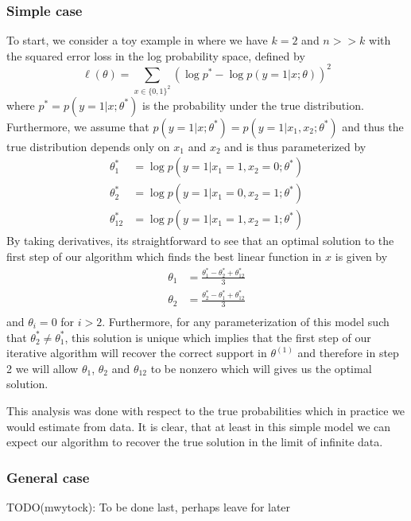 \documentclass[12pt]{article}
\begin{document}
\subsubsection{Simple case}

To start, we consider a toy example in where we have $k = 2$ and $n >> k$ with the squared error loss in the log probability space, defined by
\begin{equation}
\ell(\theta) = \sum_{x \in \{0,1\}^2} (\log p^* - \log p(y=1|x;\theta))^2
\end{equation}
where $p^* = p(y=1|x;\theta^*)$ is the probability under the true distribution. Furthermore, we assume that $p(y=1|x;\theta^*) = p(y=1|x_1,x_2;\theta^*)$ and thus the true distribution depends only on $x_1$ and $x_2$ and is thus parameterized by
\begin{equation}
\begin{split}
\theta_1^* &= \log p(y=1 |x_1 = 1,x_2=0;\theta^*) \\
\theta_2^* &= \log p(y=1 |x_1 = 0,x_2=1;\theta^*) \\
\theta_{12}^* &= \log p(y=1 |x_1 = 1,x_2=1;\theta^*)
\end{split}
\end{equation}
By taking derivatives, its straightforward to see that an optimal solution to the first step of our algorithm which finds the best linear function in $x$ is given by
\begin{equation}
\begin{split}
\theta_1 &= \frac{\theta_1^* - \theta_2^* + \theta_{12}^*}{3} \\
\theta_2 &= \frac{\theta_2^* - \theta_1^* + \theta_{12}^*}{3} \\
\end{split}
\end{equation}
and $\theta_i = 0$ for $i > 2$. Furthermore, for any parameterization of this model such that $\theta_2^* \ne \theta_1^*$, this solution is unique which implies that the first step of our iterative algorithm will recover the correct support in $\theta^{(1)}$ and therefore in step 2 we will allow $\theta_1$, $\theta_2$ and $\theta_{12}$ to be nonzero which will gives us the optimal solution.

This analysis was done with respect to the true probabilities which in practice we would estimate from data. It is clear, that at least in this simple model we can expect our algorithm to recover the true solution in the limit of infinite data. 

\subsubsection{General case}

TODO(mwytock): To be done last, perhaps leave for later
\end{document}
